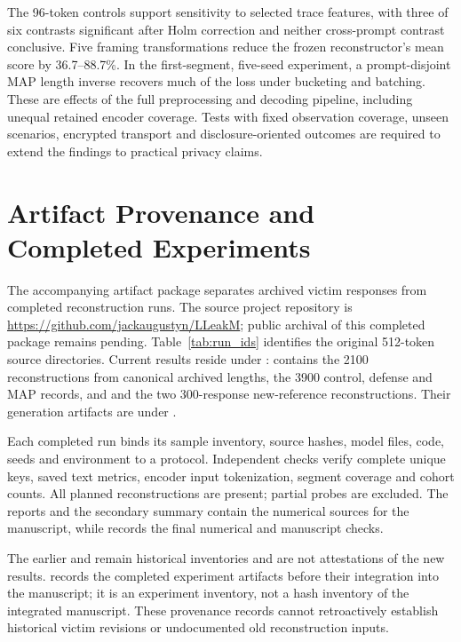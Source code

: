 \documentclass[electronics,article,submit,pdftex,moreauthors]{Definitions/mdpi}
\begin{document}
The 96-token controls support sensitivity to selected trace features, with three of six contrasts significant after Holm correction and neither cross-prompt contrast conclusive. Five framing transformations reduce the frozen reconstructor's mean score by 36.7--88.7\%. In the first-segment, five-seed experiment, a prompt-disjoint MAP length inverse recovers much of the loss under bucketing and batching. These are effects of the full preprocessing and decoding pipeline, including unequal retained encoder coverage. Tests with fixed observation coverage, unseen scenarios, encrypted transport and disclosure-oriented outcomes are required to extend the findings to practical privacy claims.

\appendixstart
\appendix
\section{Artifact Provenance and Completed Experiments}\label{app:runs}
The accompanying artifact package separates archived victim responses from completed reconstruction runs. The source project repository is \url{https://github.com/jackaugustyn/LLeakM}; public archival of this completed package remains pending. Table~\ref{tab:run_ids} identifies the original 512-token source directories. Current results reside under :  contains the 2100 reconstructions from canonical archived lengths,  the 3900 control, defense and MAP records, and  and  the two 300-response new-reference reconstructions. Their generation artifacts are under .

Each completed run binds its sample inventory, source hashes, model files, code, seeds and environment to a protocol. Independent checks verify complete unique keys, saved text metrics, encoder input tokenization, segment coverage and cohort counts. All planned reconstructions are present; partial probes are excluded. The  reports and the secondary summary contain the numerical sources for the manuscript, while  records the final numerical and manuscript checks.

The earlier  and  remain historical inventories and are not attestations of the new results.  records the completed experiment artifacts before their integration into the manuscript; it is an experiment inventory, not a hash inventory of the integrated manuscript. These provenance records cannot retroactively establish historical victim revisions or undocumented old reconstruction inputs.
\end{document}
